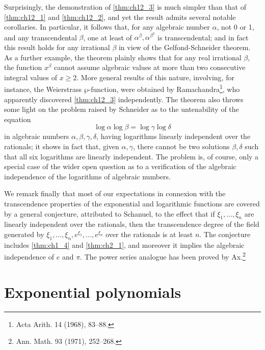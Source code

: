 Surprisingly, the demonstration of \autoref{thm:ch12_3} is much simpler than that of \autoref{thm:ch12_1} and \autoref{thm:ch12_2}, and yet the result admits several notable corollaries. In particular, it follows that, for any algebraic number $\alpha$, not 0 or 1, and any transcendental $\beta$, one at least of $\alpha^{\beta}, \alpha^{\beta^2}$ is transcendental; and in fact this result holds for any irrational $\beta$ in view of the Gelfond-Schneider theorem. As a further example, the theorem plainly shows that for any real irrational $\beta$, the function $x^{\beta}$ cannot assume algebraic values at more than two consecutive integral values of $x \ge 2$. More general results of this nature, involving, for instance, the Weierstrass $\wp$-function, were obtained by Ramachandra\footnote{Acta Arith. 14 (1968), 83--88.}, who apparently discovered \autoref{thm:ch12_3} independently. The theorem also throws some light on the problem raised by Schneider as to the untenability of the equation
\[\log \alpha \log \beta = \log \gamma \log \delta\]
in algebraic numbers $\alpha, \beta, \gamma, \delta$, having logarithms linearly independent over the rationals; it shows in fact that, given $\alpha, \gamma$, there cannot be two solutions $\beta, \delta$ such that all six logarithms are linearly independent. The problem is, of course, only a special case of the wider open question as to a verification of the algebraic independence of the logarithms of algebraic numbers.

We remark finally that most of our expectations in connexion with the transcendence properties of the exponential and logarithmic functions are covered by a general conjecture, attributed to Schanuel, to the effect that if $\xi_1, \ldots, \xi_n$ are linearly independent over the rationals, then the transcendence degree of the field generated by $\xi_1, \ldots, \xi_n, e^{\xi_1}, \ldots, e^{\xi_n}$ over the rationals is at least $n$. The conjecture includes \autoref{thm:ch1_4} and \autoref{thm:ch2_1}, and moreover it implies the algebraic independence of $e$ and $\pi$. The power series analogue has been proved by Ax.\footnote{Ann. Math. 93 (1971), 252--268.}

\section{Exponential polynomials}

